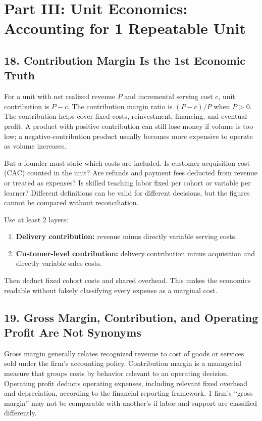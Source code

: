 \section*{Part III: Unit Economics: Accounting for 1 Repeatable Unit}

\subsection*{18. Contribution Margin Is the 1st Economic Truth}

For a unit with net realized revenue $P$ and incremental serving cost $c$, unit contribution is $P - c$. The contribution margin ratio is $(P - c)/P$ when $P > 0$. The contribution helps cover fixed costs, reinvestment, financing, and eventual profit. A product with positive contribution can still lose money if volume is too low; a negative-contribution product usually becomes more expensive to operate as volume increases.

But a founder must state which costs are included. Is customer acquisition cost (CAC) counted in the unit? Are refunds and payment fees deducted from revenue or treated as expenses? Is skilled teaching labor fixed per cohort or variable per learner? Different definitions can be valid for different decisions, but the figures cannot be compared without reconciliation.

Use at least 2 layers:
\begin{enumerate}
  \item \textbf{Delivery contribution:} revenue minus directly variable serving costs.
  \item \textbf{Customer-level contribution:} delivery contribution minus acquisition and directly variable sales costs.
\end{enumerate}
Then deduct fixed cohort costs and shared overhead. This makes the economics readable without falsely classifying every expense as a marginal cost.

\subsection*{19. Gross Margin, Contribution, and Operating Profit Are Not Synonyms}

Gross margin generally relates recognized revenue to cost of goods or services sold under the firm's accounting policy. Contribution margin is a managerial measure that groups costs by behavior relevant to an operating decision. Operating profit deducts operating expenses, including relevant fixed overhead and depreciation, according to the financial reporting framework. 1 firm's ``gross margin'' may not be comparable with another's if labor and support are classified differently.

